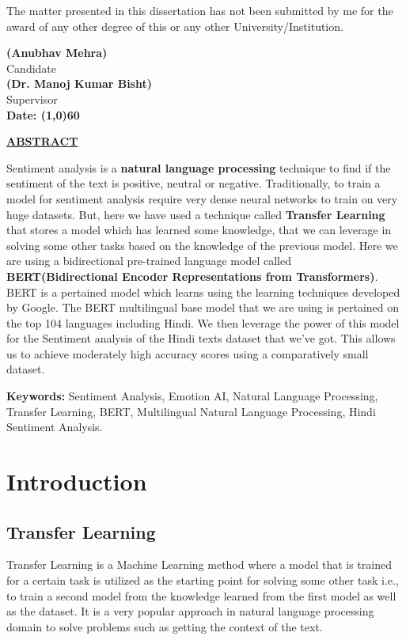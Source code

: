 \documentclass[a4paper, 12pt]{article}
\begin{document}
\begin{sloppypar}
The matter presented in this dissertation has not been submitted by me for the award of any other degree of this or any other University/Institution.
\vspace*{2cm}
\begin{flushright}
\textbf{(Anubhav Mehra)}\\
Candidate\\
\vspace*{2cm}
\textbf{(Dr. Manoj Kumar Bisht)}\\
Supervisor\\
\vspace*{1cm}
\textbf{Date: \line(1,0){60}}
\end{flushright}
\thispagestyle{empty}
\clearpage
\begin{center}
\textbf{\underline{ABSTRACT}} \\ [0.5ex]
\end{center}
 Sentiment analysis is a \textbf{natural language processing} technique to find if the sentiment of the text is positive, neutral or negative. Traditionally, to train a model for sentiment analysis require very dense neural networks to train on very huge datasets. But, here we have used a technique called \textbf{Transfer Learning} that stores a model which has learned some knowledge, that we can leverage in solving some other tasks based on the knowledge of the previous model. Here we are using a bidirectional pre-trained language model called  \textbf{BERT(Bidirectional Encoder Representations from Transformers)}. BERT is a pertained model which learns using the learning techniques developed by Google. The BERT multilingual base model that we are using is pertained on the top 104 languages including Hindi. We then leverage the power of this model for the Sentiment analysis of the Hindi texts dataset that we've got. This allows us to achieve moderately high accuracy scores using a comparatively small dataset.

\textbf{Keywords:} Sentiment Analysis, Emotion AI,  Natural Language Processing, Transfer Learning, BERT, Multilingual Natural Language Processing, Hindi Sentiment Analysis.
\thispagestyle{empty}
\clearpage
\tableofcontents
\thispagestyle{empty}
\clearpage
\listoffigures
\listoftables
\thispagestyle{empty}
\clearpage
\setcounter{page}{1}
\section{Introduction}

\subsection{Transfer Learning}
Transfer Learning is a Machine Learning method where a model that is trained for a certain task is utilized as the starting point for solving some other task i.e., to train a second model from the knowledge learned from the first model as well as the dataset. It is a very popular approach in natural language processing domain to solve problems such as getting the context of the text.


\end{sloppypar}
\end{document}

